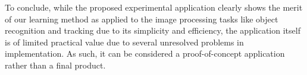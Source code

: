 To conclude, while the proposed experimental application clearly shows the merit of our learning method as applied to the image processing tasks like object recognition and tracking due to its simplicity and efficiency, the application itself is of limited practical value due to several unresolved problems in implementation. As such, it can be considered a proof-of-concept application rather than a final product. 

\ifpdf
    \graphicspath{{X/figures/PNG/}{X/figures/PDF/}{X/figures/}}
\else
    \graphicspath{{X/figures/EPS/}{X/figures/}}
\fi









